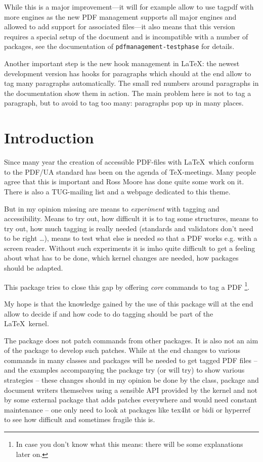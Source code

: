 \documentclass[DIV=12,parskip=half-,bibliography=totoc]{scrartcl}
\newcommand\PDF{PDF}
\begin{document}
While this is a major improvement---it will for example allow to use tagpdf with more engines as the new PDF management supports all major engines and allowed to add support for associated files---it also means that this version requires a special setup of the document and is incompatible with a number of packages,
see the documentation of \texttt{pdfmanagement-testphase} for details.

Another important step is the new hook management in \LaTeX: the newest development version has hooks for paragraphs which should at the end allow to tag many paragraphs automatically. The small red numbers around paragraphs in the documentation show them in action. The main problem here is not to tag a paragraph, but to avoid to tag too many: paragraphs pop up in many places.

\section{Introduction}

Since many year the creation of accessible \PDF{}-files with \LaTeX\ which conform to the PDF/UA standard has been on the agenda of \TeX-meetings. Many people agree that this is important and Ross Moore has done quite some work on it. There is also a TUG-mailing list and a webpage \parencite{tugaccess} dedicated to this theme.

But in my opinion missing are means to \emph{experiment} with tagging and accessibility. Means to try out, how difficult it is to tag some structures, means to try out, how much tagging is really needed (standards and validators don't need to be right \ldots), means to test what else is needed so that a \PDF{} works e.g. with a screen reader. Without such experiments it is imho quite difficult to get a feeling about what has to be done, which kernel changes are needed, how packages should be adapted.

This package tries to close this gap by offering \emph{core} commands to tag a \PDF{}%
\tagpdfparaOff\footnote{In case you don't know what this means: there will be some explanations later on.}\tagpdfparaOn.

My hope is that the knowledge gained by the use of this package will at the end allow to decide if and how code to do tagging should be part of the \LaTeX\ kernel.

The package does not patch commands from other packages. It is also not an aim of the package to develop such patches. While at the end changes to various commands in many classes and packages will be needed to get tagged \PDF{} files -- and the examples accompanying the package try (or will try) to show various strategies -- these changes should in my opinion be done by the class, package and document writers themselves using a sensible API provided by the kernel and not by some external package that adds patches everywhere and would need constant maintenance -- one only need to look at packages like tex4ht or bidi or hyperref to see how difficult and sometimes fragile this is.
\end{document}
